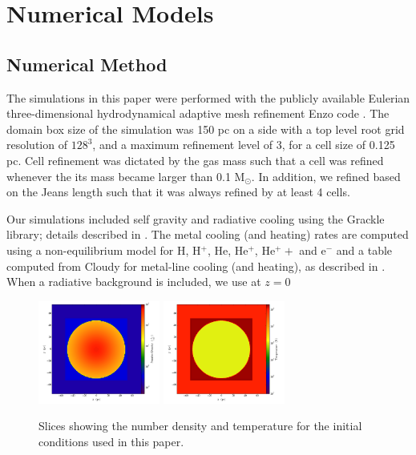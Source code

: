 \documentclass[useAMS,usenatbib]{mn2e}
\begin{document}
\section{Numerical Models}
\label{sec:numerical}
\subsection{Numerical Method}

The simulations in this paper were performed with the publicly available Eulerian three-dimensional
hydrodynamical adaptive mesh refinement Enzo code \citep{Bryan2014}. The domain
box size of the simulation was 150 pc on a side with a top level root grid resolution of $128^3$, and
a maximum refinement level of 3, for a cell size of 0.125 pc.  Cell refinement was dictated 
by the gas mass such that a cell was refined whenever the its mass became larger than 0.1 M$_\odot$.
In addition, we refined based on the Jeans length such that it was
always refined by at least 4 cells.

Our simulations included self gravity and radiative cooling using the
Grackle library; details described in \cite{Bryan2014}. The metal cooling (and
heating) rates are computed using a non-equilibrium model for H, H$^+$, He, He$^+$, He$^++$ and e$^-$
and a table computed from Cloudy for metal-line cooling (and heating), as described in \citet{Smith2016}.
When a radiative background is included, we use \cite{Haardt2012} at $z=$0

\begin{figure}
\begin{center}
\includegraphics[width=4cm]{Images/Initial_number_density}
\includegraphics[width=4cm]{Images/Initial_temperature}
\end{center}
\caption{\label{fig:initial_setup} Slices showing the number density and temperature 
for the initial conditions used in this paper. }
\end{figure}
\end{document}
